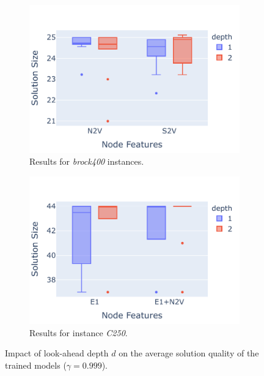 \documentclass[draft,final]{vutinfth} %
\begin{document}
\begin{figure}
    \centering
    \begin{subfigure}{0.49\textwidth}
        \centering
        \includegraphics[width=\textwidth]{graphics/lookahead-depth-1.pdf}
        \caption{Results for \emph{brock400} instances.}
    \end{subfigure}
    \begin{subfigure}{0.49\textwidth}
        \centering
        \includegraphics[width=\textwidth]{graphics/lookahead-depth-2.pdf}
        \caption{Results for instance \emph{C250}.}
    \end{subfigure}
    \caption{Impact of look-ahead depth $d$ on the average solution quality of the trained models ($\gamma=0.999$).}
    \label{fig:lookahead-depth}
\end{figure}
\end{document}
